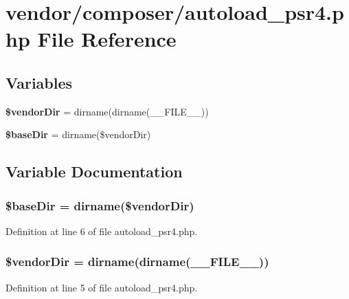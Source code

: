 \section{vendor/composer/autoload\+\_\+psr4.php File Reference}
\label{autoload__psr4_8php}
\subsection*{Variables}
\begin{DoxyCompactItemize}
\item 
{\bf \$vendor\+Dir} = dirname(dirname(\+\_\+\+\_\+\+F\+I\+L\+E\+\_\+\+\_\+))
\item 
{\bf \$base\+Dir} = dirname(\$vendor\+Dir)
\end{DoxyCompactItemize}


\subsection{Variable Documentation}
\subsubsection[{\$base\+Dir}]{\setlength{\rightskip}{0pt plus 5cm}\$base\+Dir = dirname(\$vendor\+Dir)}\label{autoload__psr4_8php_a873fc20cf44ad2f766893e95aab8df78}


Definition at line 6 of file autoload\+\_\+psr4.\+php.

\subsubsection[{\$vendor\+Dir}]{\setlength{\rightskip}{0pt plus 5cm}\$vendor\+Dir = dirname(dirname(\+\_\+\+\_\+\+F\+I\+L\+E\+\_\+\+\_\+))}\label{autoload__psr4_8php_a7fbc3633c79d7461383710e09d497fb0}


Definition at line 5 of file autoload\+\_\+psr4.\+php.

